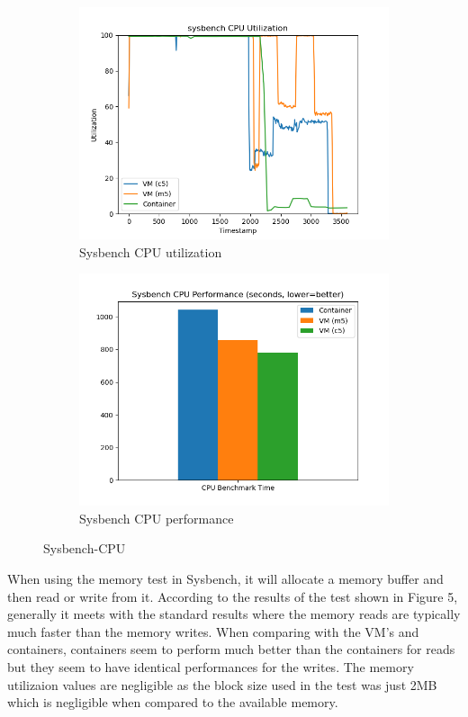 \documentclass[11pt]{article}
\begin{document}
\begin{figure}[hbt!]
\centering
\begin{subfigure}{.5\textwidth}
  \centering
  \includegraphics[width=1.1\linewidth]{sysbench_cpu.png}
  \caption{Sysbench CPU utilization}
  \label{fig:sysb1}
\end{subfigure}%
\begin{subfigure}{.5\textwidth}
  \centering
  \includegraphics[width=1.1\linewidth]{sysbench_cpu_bar.png}
  \caption{Sysbench CPU performance}
  \label{fig:sysb2}
\end{subfigure}
\caption{Sysbench-CPU}
\label{fig:rubis}
\end{figure}

When using the memory test in Sysbench, it will allocate a memory buffer and then read or write from it. According to the results of the test shown in Figure 5, generally it meets with the standard results where the memory reads are typically much faster than the memory writes. When comparing with the VM's and containers, containers seem to perform much better than the containers for reads but they seem to have identical performances for the writes. The memory utilizaion values are negligible as the block size used in the test was just 2MB which is negligible when compared to the available memory. 
\end{document}
